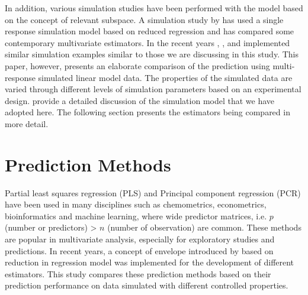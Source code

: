 \documentclass[review]{elsarticle}
\begin{document}
In addition, various simulation studies have been performed with the
model based on the concept of relevant subspace. A simulation study by
\citet{Alm_y_1996} has used a single response simulation model based on
reduced regression and has compared some contemporary multivariate
estimators. In the recent years \citet{helland2012near},
\citet{saebo2015simrel}, \citet{helland2016algorithms} and
\citet{Rimal2018} implemented similar simulation examples similar to
those we are discussing in this study. This paper, however, presents an
elaborate comparison of the prediction using multi-response simulated
linear model data. The properties of the simulated data are varied
through different levels of simulation parameters based on an
experimental design. \citet{Rimal2018} provide a detailed discussion of
the simulation model that we have adopted here. The following section
presents the estimators being compared in more detail.

\section{Prediction Methods}\label{prediction-methods}

Partial least squares regression (PLS) and Principal component
regression (PCR) have been used in many disciplines such as
chemometrics, econometrics, bioinformatics and machine learning, where
wide predictor matrices, i.e. \(p\) (number or predictors)
\textgreater{} \(n\) (number of observation) are common. These methods
are popular in multivariate analysis, especially for exploratory studies
and predictions. In recent years, a concept of envelope introduced by
\citet{Cook2007a} based on reduction in regression model was implemented
for the development of different estimators. This study compares these
prediction methods based on their prediction performance on data
simulated with different controlled properties.
\end{document}
